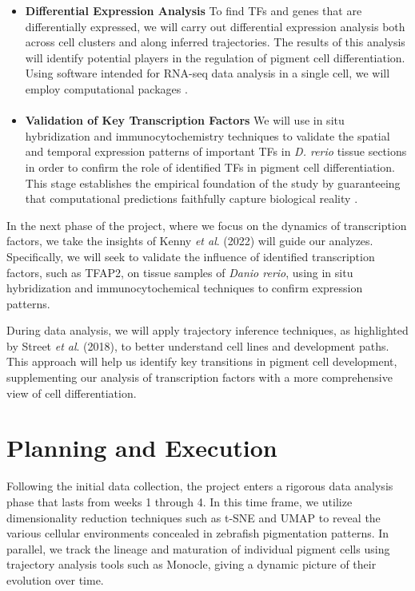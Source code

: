 \documentclass[runningheads]{llncs}
\begin{document}
    \begin{itemize}
        \item \textbf{Differential Expression Analysis}
        To find TFs and genes that are differentially expressed, we will carry out differential expression analysis both across cell clusters and along inferred trajectories. The results of this analysis will identify potential players in the regulation of pigment cell differentiation. Using software intended for RNA-seq data analysis in a single cell, we will employ computational packages \cite{nayak2021hitchhiker,kulkarni2019beyond}.        
        \paragraph{}
        \item \textbf{Validation of Key Transcription Factors}
        We will use in situ hybridization and immunocytochemistry techniques to validate the spatial and temporal expression patterns of important TFs in \textit{D. rerio} tissue sections in order to confirm the role of identified TFs in pigment cell differentiation. This stage establishes the empirical foundation of the study by guaranteeing that computational predictions faithfully capture biological reality \cite{phipson2022propeller}.        
    \end{itemize}

In the next phase of the project, where we focus on the dynamics of transcription factors, we take the insights of Kenny \textit{et al}. (2022) will guide our analyzes. Specifically, we will seek to validate the influence of identified transcription factors, such as TFAP2, on tissue samples of \textit{Danio rerio}, using in situ hybridization and immunocytochemical techniques to confirm \cite{kenny2022tfap2} expression patterns.

During data analysis, we will apply trajectory inference techniques, as highlighted by Street \textit{et al}. (2018), to better understand cell lines and development paths. This approach will help us identify key transitions in pigment cell development, supplementing our analysis of transcription factors with a more comprehensive view of cell differentiation.

\section{Planning and Execution}

Following the initial data collection, the project enters a rigorous data analysis phase that lasts from weeks 1 through 4. In this time frame, we utilize dimensionality reduction techniques such as t-SNE and UMAP to reveal the various cellular environments concealed in zebrafish pigmentation patterns. In parallel, we track the lineage and maturation of individual pigment cells using trajectory analysis tools such as Monocle, giving a dynamic picture of their evolution over time.
\end{document}

